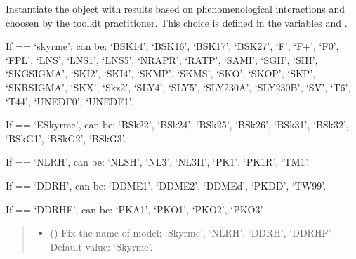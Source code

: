 \documentclass[letterpaper,10pt,english]{sphinxmanual}
\begin{document}
\begin{fulllineitems}
\label{\detokenize{source/api/setup_eos_pheno_esym:nucleardatapy.eos.setup_pheno_esym.setupPhenoEsym}}
\pysigstartsignatures
{}
\pysigstopsignatures
\sphinxAtStartPar
Instantiate the object with results based on phenomenological    interactions and choosen by the toolkit practitioner.     This choice is defined in the variables  and .

\sphinxAtStartPar
If  == ‘skyrme’,  can be: ‘BSK14’,     ‘BSK16’, ‘BSK17’, ‘BSK27’, ‘F\sphinxhyphen{}’, ‘F+’, ‘F0’, ‘FPL’, ‘LNS’, ‘LNS1’, ‘LNS5’,     ‘NRAPR’, ‘RATP’, ‘SAMI’, ‘SGII’, ‘SIII’, ‘SKGSIGMA’, ‘SKI2’, ‘SKI4’, ‘SKMP’,     ‘SKMS’, ‘SKO’, ‘SKOP’, ‘SKP’, ‘SKRSIGMA’, ‘SKX’, ‘Skz2’, ‘SLY4’, ‘SLY5’,     ‘SLY230A’, ‘SLY230B’, ‘SV’, ‘T6’, ‘T44’, ‘UNEDF0’, ‘UNEDF1’.

\sphinxAtStartPar
If  == ‘ESkyrme’,  can be: ‘BSk22’, ‘BSk24’, ‘BSk25’,     ‘BSk26’, ‘BSk31’, ‘BSk32’, ‘BSkG1’, ‘BSkG2’, ‘BSkG3’.

\sphinxAtStartPar
If  == ‘NLRH’,  can be: ‘NL\sphinxhyphen{}SH’, ‘NL3’, ‘NL3II’, ‘PK1’, ‘PK1R’, ‘TM1’.

\sphinxAtStartPar
If  == ‘DDRH’,  can be: ‘DDME1’, ‘DDME2’, ‘DDMEd’, ‘PKDD’, ‘TW99’.

\sphinxAtStartPar
If  == ‘DDRHF’,  can be: ‘PKA1’, ‘PKO1’, ‘PKO2’, ‘PKO3’.
\begin{quote}\begin{description}
\begin{itemize}
\item {} 
\sphinxAtStartPar
{} (\sphinxstyleliteralemphasis{\sphinxupquote{, }}) \textendash{} Fix the name of model: ‘Skyrme’, ‘NLRH’,     ‘DDRH’, ‘DDRHF’. Default value: ‘Skyrme’.


\end{itemize}
\end{description}
\end{quote}
\end{fulllineitems}
\end{document}
